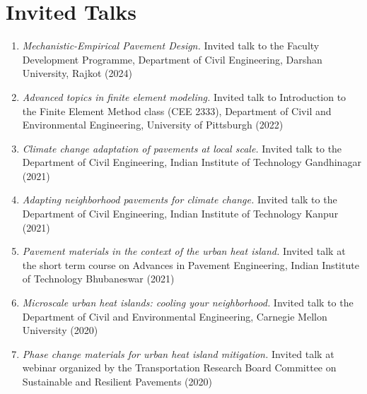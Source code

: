 \documentclass[12pt]{article}
\begin{document}
\bigskip
\section*{Invited Talks}
\hfill
\begin{enumerate}
	\item \textit{Mechanistic-Empirical Pavement Design.} Invited talk to the Faculty Development Programme, Department of Civil Engineering, Darshan University, Rajkot (2024)
	\item \textit{Advanced topics in finite element modeling.} Invited talk to Introduction to the Finite Element Method class (CEE 2333), Department of Civil and Environmental Engineering, University of Pittsburgh (2022)
	\item \textit{Climate change adaptation of pavements at local scale.} Invited talk to the Department of Civil Engineering, Indian Institute of Technology Gandhinagar (2021)	
	\item \textit{Adapting neighborhood pavements for climate change.} Invited talk to the Department of Civil Engineering, Indian Institute of Technology Kanpur (2021)	
	\item \textit{Pavement materials in the context of the urban heat island.} Invited talk at the short term course on Advances in Pavement Engineering, Indian Institute of Technology Bhubaneswar (2021)	
	\item \textit{Microscale urban heat islands: cooling your neighborhood.} Invited talk to the Department of Civil and Environmental Engineering, Carnegie Mellon University (2020)
	\item \textit{Phase change materials for urban heat island mitigation.} Invited talk at webinar organized by the Transportation Research Board Committee on Sustainable and Resilient Pavements (2020)
\end{enumerate}

\bigskip
\end{document}
